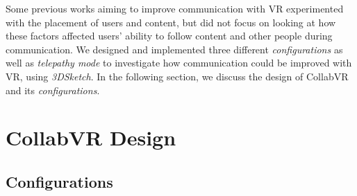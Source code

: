 \documentclass[chi_draft]{sigchi}
\begin{document}

Some previous works aiming to improve communication with VR experimented with the placement of users and content, but did not focus on looking at how these factors affected users' ability to follow content and other people during communication. We designed and implemented three different \textit{configurations} as well as \textit{telepathy mode} to investigate how communication could be improved with VR, using \textit{3DSketch}. In the following section, we discuss the design of CollabVR and its \textit{configurations}.

\section{CollabVR Design}
\subsection{Configurations}
\end{document}
